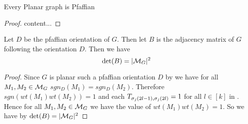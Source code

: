 \begin{theorem}
	Every Planar graph is Pfaffian 
\end{theorem}
\begin{proof}
	content...
\end{proof}
\begin{theorem}
	Let $D$ be the pfaffian orientation of $G$. Then let $B$ is the adjacency matrix of $G$ following the orientation $D$. Then we have $$\det(B)=|\mathcal{M}_G|^2$$
\end{theorem}
\begin{proof}
	Since $G$ is planar such a pfaffian orientation $D$ by  we have for all $M_1,M_2\in \mathcal{M}_G$ $sgn_D(M_1)=sgn_D(M_2)$. Therefore $sgn(wt(M_1)wt(M_2))=1$ and each $T_{\sigma_j(2l-1),\sigma_j(2l)}=1$ for all $l\in [k]$ in . Hence for all $M_1,M_2\in \mathcal{M}_G$ we have the value of $wt(M_1)wt(M_2)=1$. So we have by  $\det(B)=|\mathcal{M}_G|^2$
\end{proof}



